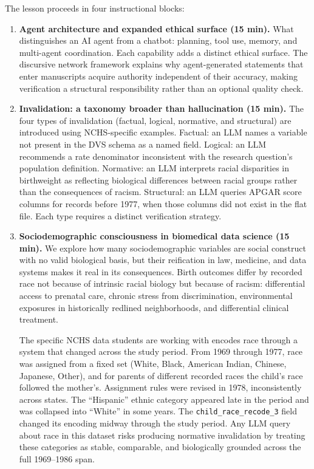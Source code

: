The lesson proceeds in four instructional blocks:

\begin{enumerate}
    \item \textbf{Agent architecture and expanded ethical surface
    (15 min).} What distinguishes an AI agent from a chatbot:
    planning, tool use, memory, and multi-agent coordination.
    Each capability adds a distinct ethical surface. The discursive
    network framework explains why agent-generated statements that
    enter manuscripts acquire authority independent of their accuracy,
    making verification a structural responsibility rather than an
    optional quality check.

    \item \textbf{Invalidation: a taxonomy broader than hallucination
    (15 min).} The four types of invalidation (factual, logical,
    normative, and structural) are introduced using NCHS-specific
    examples. Factual: an LLM names a variable not present in the
    DVS schema as a named field. Logical: an LLM recommends a rate
    denominator inconsistent with the research question's population
    definition. Normative: an LLM interprets racial disparities in
    birthweight as reflecting biological differences between racial
    groups rather than the consequences of racism. Structural: an
    LLM queries APGAR score columns for records before 1977, when
    those columns did not exist in the flat file. Each type requires
    a distinct verification strategy.

    \item \textbf{Sociodemographic consciousness in biomedical data science
    (15 min).}   We explore how many sociodemographic variables are  
    social construct with no valid biological
    basis, but their reification in law, medicine, and data systems
    makes it real in its consequences. Birth outcomes differ by
    recorded race not because of intrinsic racial biology but because
    of racism: differential access to prenatal care, chronic stress
    from discrimination, environmental exposures in historically
    redlined neighborhoods, and differential clinical treatment.

    The specific NCHS data students are working with encodes race
    through a system that changed across the study period. From 1969
    through 1977, race was assigned from a fixed set (White, Black,
    American Indian, Chinese, Japanese, Other), and for parents
    of different recorded races the child's race followed the
    mother's. Assignment rules were revised in 1978, inconsistently
    across states. The ``Hispanic'' ethnic category appeared late
    in the period and was collapsed into ``White'' in some years.
    The \texttt{child\_race\_recode\_3} field changed its encoding
    midway through the study period. Any LLM query about race in
    this dataset risks producing normative invalidation by treating
    these categories as stable, comparable, and biologically grounded
    across the full 1969--1986 span. 


\end{enumerate}
